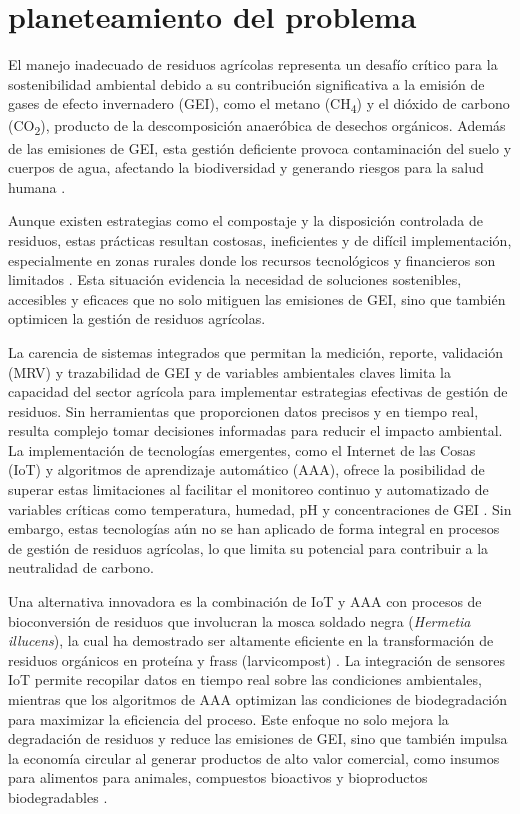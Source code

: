 \chapter{planeteamiento del problema}

El manejo inadecuado de residuos agrícolas representa un desafío crítico para la sostenibilidad ambiental debido a su contribución significativa a la emisión de gases de efecto invernadero (GEI), como el metano (CH\textsubscript{4}) y el dióxido de carbono (CO\textsubscript{2}), producto de la descomposición anaeróbica de desechos orgánicos. Además de las emisiones de GEI, esta gestión deficiente provoca contaminación del suelo y cuerpos de agua, afectando la biodiversidad y generando riesgos para la salud humana \parencite{FAO2021,IPCC2014}. 

Aunque existen estrategias como el compostaje y la disposición controlada de residuos, estas prácticas resultan costosas, ineficientes y de difícil implementación, especialmente en zonas rurales donde los recursos tecnológicos y financieros son limitados \parencite{Smith2014}. Esta situación evidencia la necesidad de soluciones sostenibles, accesibles y eficaces que no solo mitiguen las emisiones de GEI, sino que también optimicen la gestión de residuos agrícolas.

La carencia de sistemas integrados que permitan la medición, reporte, validación (MRV) y trazabilidad de GEI y de variables ambientales claves limita la capacidad del sector agrícola para implementar estrategias efectivas de gestión de residuos. Sin herramientas que proporcionen datos precisos y en tiempo real, resulta complejo tomar decisiones informadas para reducir el impacto ambiental. La implementación de tecnologías emergentes, como el Internet de las Cosas (IoT) y algoritmos de aprendizaje automático (AAA), ofrece la posibilidad de superar estas limitaciones al facilitar el monitoreo continuo y automatizado de variables críticas como temperatura, humedad, pH y concentraciones de GEI \parencite{kamilaris2017review}. Sin embargo, estas tecnologías aún no se han aplicado de forma integral en procesos de gestión de residuos agrícolas, lo que limita su potencial para contribuir a la neutralidad de carbono. 

Una alternativa innovadora es la combinación de IoT y AAA con procesos de bioconversión de residuos que involucran la mosca soldado negra (\textit{Hermetia illucens}), la cual ha demostrado ser altamente eficiente en la transformación de residuos orgánicos en proteína y frass (larvicompost) \parencite{barragan2017nutritional,Bermudez2023}. La integración de sensores IoT permite recopilar datos en tiempo real sobre las condiciones ambientales, mientras que los algoritmos de AAA optimizan las condiciones de biodegradación para maximizar la eficiencia del proceso. Este enfoque no solo mejora la degradación de residuos y reduce las emisiones de GEI, sino que también impulsa la economía circular al generar productos de alto valor comercial, como insumos para alimentos para animales, compuestos bioactivos y bioproductos biodegradables \parencite{Diener2011,Salam2022}.

